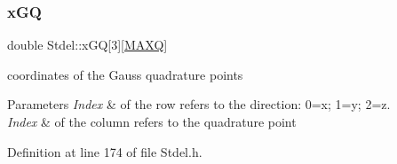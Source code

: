 \mbox{\label{classStdel_adedcb4d4faa12adf348054780a3b2c1a}} 
\subsubsection{\texorpdfstring{x\+GQ}{xGQ}}
{\footnotesize\ttfamily double Stdel\+::x\+GQ\mbox{[}3\mbox{]}\mbox{[}\hyperlink{MyOptions_8h_af708e94d886ba3f59582612949cac702}{M\+A\+XQ}\mbox{]}\hspace{0.3cm}{\ttfamily [protected]}}

coordinates of the Gauss quadrature points 
\begin{DoxyParams}{Parameters}
{\em Index} & of the row refers to the direction\+: 0=x; 1=y; 2=z. \\
\hline
{\em Index} & of the column refers to the quadrature point \\
\hline
\end{DoxyParams}


Definition at line 174 of file Stdel.\+h.



